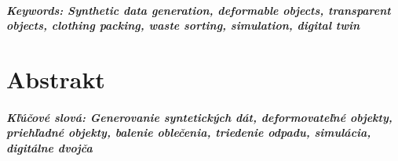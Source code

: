 \documentclass[12pt, twoside, openany]{book}
\begin{document}
\paragraph*{Keywords: Synthetic data generation, deformable objects, transparent objects, clothing
packing, waste sorting, simulation, digital twin}


\newpage 
\thispagestyle{empty}
\chapter*{Abstrakt}\label{chap:abstract_sk}


\paragraph*{Kľúčové slová: Generovanie syntetických dát, deformovateľné objekty, priehľadné objekty,
    balenie oblečenia, triedenie odpadu, simulácia, digitálne dvojča}




\newpage 
\tableofcontents



\newpage 
\listoffigures
\listoftables




\mainmatter













\backmatter

\nocite{*}



\end{document}
